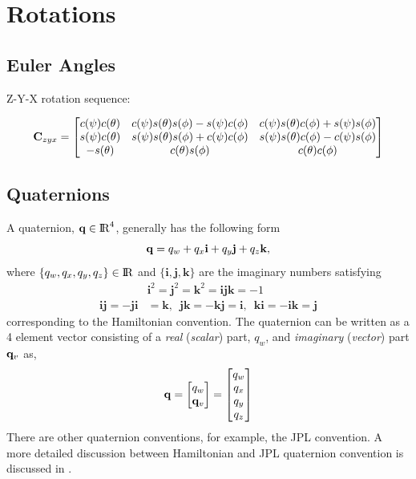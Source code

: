 \chapter{Rotations}

\section{Euler Angles}
Z-Y-X rotation sequence:

\begin{equation}
  {{\mathbf{C}}}_{zyx} =
  \begin{bmatrix}
    c(\psi) c(\theta)
    & c(\psi) s(\theta) s(\phi) - s(\psi) c(\phi)
    & c(\psi) s(\theta) c(\phi) + s(\psi) s(\phi) \\
    s(\psi) c(\theta)
    & s(\psi) s(\theta) s(\phi) + c(\psi) c(\phi)
    & s(\psi) s(\theta) c(\phi) - c(\psi) s(\phi) \\
    -s(\theta) & c(\theta) s(\phi) & c(\theta) c(\phi)
  \end{bmatrix}
\end{equation}



\section{Quaternions}

A quaternion, ${\mathbf{q}} \in {\rm I\!R}^{4}$, generally has the following form
%
\begin{equation}
  {{\mathbf{q}}} = q_{w} + q_{x} \mathbf{i} + q_{y} \mathbf{j} + q_{z} \mathbf{k},
\end{equation}
%
where $\{ q_{w}, q_{x}, q_{y}, q_{z} \} \in {\rm I\!R}$ and $\{ \mathbf{i}, \mathbf{j},
\mathbf{k} \}$ are the imaginary numbers satisfying
%
\begin{equation}
\begin{split}
  &\mathbf{i}^{2}
  = \mathbf{j}^{2}
  = \mathbf{k}^{2}
  = \mathbf{ijk}
  = -1 \\
  \mathbf{ij} = -\mathbf{ji} &= \mathbf{k}, \enspace
  \mathbf{jk} = -\mathbf{kj} = \mathbf{i}, \enspace
  \mathbf{ki} = -\mathbf{ik} = \mathbf{j}
\end{split}
\end{equation}
%
corresponding to the Hamiltonian convention. The quaternion can be written as a
4 element vector consisting of a \textit{real} (\textit{scalar}) part, $q_{w}$,
and \textit{imaginary} (\textit{vector}) part ${{\mathbf{q}}}_{v}$ as,
%
\begin{equation}
  {{\mathbf{q}}} =
  \begin{bmatrix} q_{w} \\ {{\mathbf{q}}}_{v} \end{bmatrix} =
  \begin{bmatrix} q_{w} \\ q_{x} \\ q_{y} \\ q_{z} \end{bmatrix}
\end{equation}
%
There are other quaternion conventions, for example, the JPL convention. A more
detailed discussion between Hamiltonian and JPL quaternion convention is
discussed in \cite{Sola2017}.


